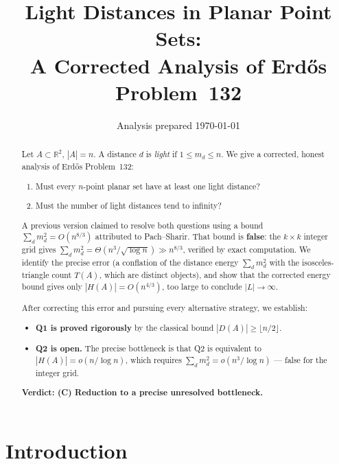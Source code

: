 \documentclass[12pt,a4paper]{amsart}
\def\cL{\textit{L}}\def\cH{\textit{H}}%
\theoremstyle{plain}
\theoremstyle{definition}
\newcommand{\R}{\mathbb{R}}
\newcommand{\cL}{\mathcal{L}}
\newcommand{\cH}{\mathcal{H}}
\begin{document}

\title[Light Distances --- Corrected Analysis]{%
  Light Distances in Planar Point Sets:\\
  A Corrected Analysis of Erd\H{o}s Problem~132}

\author{Analysis prepared \today}
\date{}

\begin{abstract}
Let $A \subset \R^2$, $|A|=n$.  A distance $d$ is \emph{light} if
$1 \le m_d \le n$.  We give a corrected, honest analysis of
Erd\H{o}s Problem~132:
\begin{enumerate}[label=(\arabic*)]
\item Must every $n$-point planar set have at least one light distance?
\item Must the number of light distances tend to infinity?
\end{enumerate}
A previous version claimed to resolve both questions using a bound
$\sum_d m_d^2 = O(n^{8/3})$ attributed to Pach--Sharir.
That bound is \textbf{false}: the $k\times k$ integer grid gives
$\sum_d m_d^2 = \Theta(n^3/\sqrt{\log n}) \gg n^{8/3}$,
verified by exact computation.  We identify the precise error
(a conflation of the distance energy $\sum_d m_d^2$ with the
isosceles-triangle count $T(A)$, which are distinct objects),
and show that the corrected energy bound gives only
$|\cH(A)| = O(n^{4/3})$, too large to conclude $|\cL|\to\infty$.

After correcting this error and pursuing every alternative strategy,
we establish:
\begin{itemize}
\item \textbf{Q1 is proved rigorously} by the classical bound
      $|D(A)|\ge\lfloor n/2\rfloor$.
\item \textbf{Q2 is open.}  The precise bottleneck is that Q2
      is equivalent to $|\cH(A)| = o(n/\log n)$, which requires
      $\sum_d m_d^2 = o(n^3/\log n)$ --- false for the integer grid.
\end{itemize}
\textbf{Verdict: (C) Reduction to a precise unresolved bottleneck.}
\end{abstract}

\maketitle
\tableofcontents

\section{Introduction}
\label{sec:intro}
\end{document}
